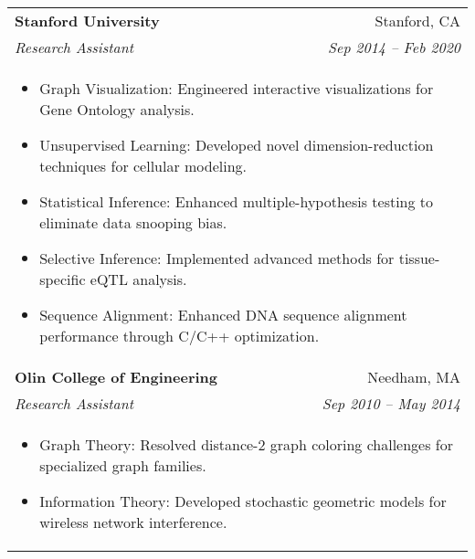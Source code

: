 \documentclass[letterpaper,11pt]{article}
\begin{document}
\begin{tabular*}{0.97\textwidth}[t]{l@{\extracolsep{\fill}}r}
  \textbf{Stanford University} & Stanford, CA \\
  \textit{\small Research Assistant} & \textit{\small Sep 2014 -- Feb 2020} \\
  \multicolumn{2}{l}{
    \begin{minipage}{\textwidth}
      \vspace{0.3em}
      \begin{itemize}[leftmargin=*, itemsep=-4.5pt, topsep=0pt, label={\raisebox{0.4ex}{\tiny\textbullet}}]
        \item  Graph Visualization: Engineered interactive visualizations for Gene Ontology analysis. %
        \item  Unsupervised Learning: Developed novel dimension-reduction techniques for cellular modeling. %
        \item  Statistical Inference: Enhanced multiple-hypothesis testing to eliminate data snooping bias. %
        \item  Selective Inference: Implemented advanced methods for tissue-specific eQTL analysis. %
        \item  Sequence Alignment: Enhanced DNA sequence alignment performance through C/C++ optimization. %
      \end{itemize}
    \end{minipage}
  } \\
  \noalign{\vspace{0.7em}}

  \textbf{Olin College of Engineering} & Needham, MA \\
  \textit{\small Research Assistant} & \textit{\small Sep 2010 -- May 2014} \\
  \multicolumn{2}{l}{
    \begin{minipage}{\textwidth}
      \vspace{0.3em}
      \begin{itemize}[leftmargin=*, itemsep=-4.5pt, topsep=0pt, label={\raisebox{0.4ex}{\tiny\textbullet}}]
        \item  Graph Theory: Resolved distance-2 graph coloring challenges for specialized graph families.
        \item  Information Theory: Developed stochastic geometric models for wireless network interference.
      \end{itemize}
    \end{minipage}
  } \\
\end{tabular*}
\end{document}
